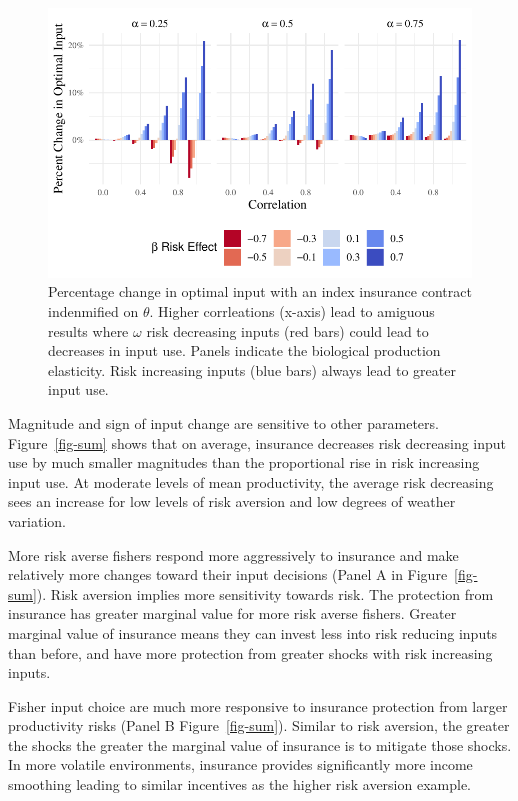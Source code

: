 \documentclass[
  letterpaper,
  DIV=11,
  numbers=noendperiod]{scrartcl}
\theoremstyle{plain}
\theoremstyle{plain}
\theoremstyle{remark}
\begin{document}
\begin{figure}

{\centering \includegraphics{ibi-behavior_files/figure-pdf/fig-corr-theta-1.pdf}

}

\caption{\label{fig-corr-theta}Percentage change in optimal input with
an index insurance contract indenmified on \(\theta\). Higher
corrleations (x-axis) lead to amiguous results where \(\omega\) risk
decreasing inputs (red bars) could lead to decreases in input use.
Panels indicate the biological production elasticity. Risk increasing
inputs (blue bars) always lead to greater input use.}

\end{figure}

Magnitude and sign of input change are sensitive to other parameters.
Figure~\ref{fig-sum} shows that on average, insurance decreases risk
decreasing input use by much smaller magnitudes than the proportional
rise in risk increasing input use. At moderate levels of mean
productivity, the average risk decreasing sees an increase for low
levels of risk aversion and low degrees of weather variation.

More risk averse fishers respond more aggressively to insurance and make
relatively more changes toward their input decisions (Panel A in
Figure~\ref{fig-sum}). Risk aversion implies more sensitivity towards
risk. The protection from insurance has greater marginal value for more
risk averse fishers. Greater marginal value of insurance means they can
invest less into risk reducing inputs than before, and have more
protection from greater shocks with risk increasing inputs.

Fisher input choice are much more responsive to insurance protection
from larger productivity risks (Panel B Figure~\ref{fig-sum}). Similar
to risk aversion, the greater the shocks the greater the marginal value
of insurance is to mitigate those shocks. In more volatile environments,
insurance provides significantly more income smoothing leading to
similar incentives as the higher risk aversion example.
\end{document}
